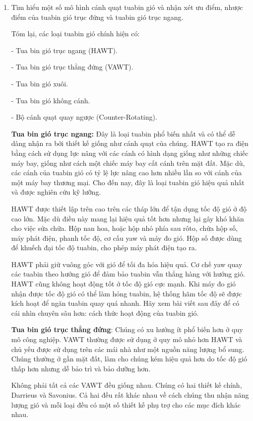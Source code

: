 \begin{enumerate}[label=\bfseries Câu \arabic*:]
{		
	}
	
	\item {}
	
	
	{
		Tìm hiểu một số mô hình cánh quạt tuabin gió và nhận xét ưu điểm, nhược điểm của tuabin gió trục đứng và tuabin gió trục ngang.
	}
	
	\hideall
	{
		Tóm lại, các loại tuabin gió chính hiện có:
		
		- Tua bin gió trục ngang (HAWT).
		
		- Tua bin gió trục thẳng đứng (VAWT).
		
		- Tua bin gió xuôi.
		
		- Tua bin gió không cánh.
		
		- Bộ cánh quạt quay ngược (Counter-Rotating).
		
		\textbf{Tua bin gió trục ngang:} Đây là loại tuabin phổ biến nhất và có thể dễ dàng nhận ra bởi thiết kế giống như cánh quạt của chúng. HAWT tạo ra điện bằng cách sử dụng lực nâng với các cánh có hình dạng giống như những chiếc máy bay, giống như cách một chiếc máy bay cất cánh trên mặt đất. Mặc dù, các cánh của tuabin gió có tỷ lệ lực nâng cao hơn nhiều lần so với cánh của một máy bay thương mại. Cho đến nay, đây là loại tuabin gió hiệu quả nhất và được nghiên cứu kỹ lưỡng.
		
		HAWT được thiết lập trên cao trên các tháp lớn để tận dụng tốc độ gió ở độ cao lớn. Mặc dù điều này mang lại hiệu quả tốt hơn nhưng lại gây khó khăn cho việc sửa chữa. Hộp nan hoa, hoặc hộp nhỏ phía sau rôto, chứa hộp số, máy phát điện, phanh tốc độ, cơ cấu yaw và máy đo gió. Hộp số được dùng để khuếch đại tốc độ tuabin, cho phép máy phát điện tạo ra.
		
		HAWT phải giữ vuông góc với gió để tối đa hóa hiệu quả. Cơ chế yaw quay các tuabin theo hướng gió để đảm bảo tuabin vẫn thẳng hàng với hướng gió. HAWT cũng không hoạt động tốt ở tốc độ gió cực mạnh. Khi máy đo gió nhận được tốc độ gió có thể làm hỏng tuabin, hệ thống hãm tốc độ sẽ được kích hoạt để ngăn tuabin quay quá nhanh. Hãy xem bài viết sau đây để có cái nhìn chuyên sâu hơn: cách thức hoạt động của tuabin gió.
		
		\textbf{Tua bin gió trục thẳng đứng}: Chúng có xu hướng ít phổ biến hơn ở quy mô công nghiệp. VAWT thường được sử dụng ở quy mô nhỏ hơn HAWT và chủ yếu được sử dụng trên các mái nhà như một nguồn năng lượng bổ sung. Chúng thường ở gần mặt đất, làm cho chúng kém hiệu quả hơn do tốc độ gió thấp hơn nhưng dễ bảo trì và bảo dưỡng hơn.
		
		Không phải tất cả các VAWT đều giống nhau. Chúng có hai thiết kế chính, Darrieus và Savonius. Cả hai đều rất khác nhau về cách chúng thu nhận năng lượng gió và mỗi loại đều có một số thiết kế phụ trợ cho các mục đích khác nhau.
		
}
\end{enumerate}
